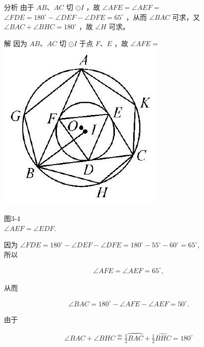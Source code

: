 \documentclass[10pt]{article}
\begin{document}
分析 由于 $A B 、 A C$ 切 $\odot I$ ，故 $\angle A F E=\angle A E F=$ $\angle F D E=180^{\circ}-\angle D E F-\angle D F E=65^{\circ}$ ，从而 $\angle B A C$ 可求，又 $\angle B A C+\angle B H C=180^{\circ}$ ，故 $\angle H$ 可求。

解 因为 $A B 、 A C$ 切 $\odot I$ 于点 $F 、 E$ ，故 $\angle A F E=$\\
\includegraphics[max width=\textwidth, center]{2024_10_30_66b8e5e701da2093c133g-024}

图3-4\\
$\angle A E F=\angle E D F$.

因为 $\angle F D E=180^{\circ}-\angle D E F-\angle D F E=180^{\circ}-55^{\circ}-60^{\circ}=65^{\circ}$,\\
所以

\begin{align*}
\angle A F E=\angle A E F=65^{\circ},
\end{align*}

从而

\begin{align*}
\angle B A C=180^{\circ}-\angle A F E-\angle A E F=50^{\circ} .
\end{align*}

由于

\begin{align*}
\angle B A C+\angle B H C \stackrel{m}{=} \frac{1}{2} \overparen{B A C}+\frac{1}{2} \widehat{B H C}=180^{\circ}
\end{align*}
\end{document}
